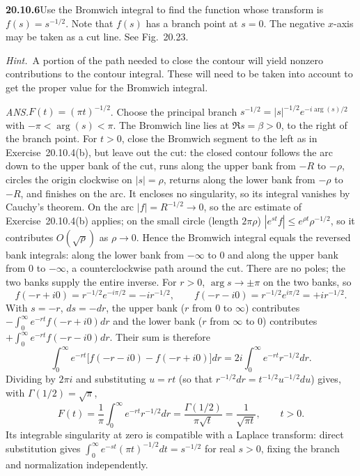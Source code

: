 \par\bigskip
\noindent\textbf{20.10.6}\quad Use the Bromwich integral to find
the function whose transform is $f(s)=s^{-1/2}$. Note that $f(s)$
has a branch point at $s=0$. The negative $x$-axis may be taken
as a cut line. See Fig.~20.23.
\par\emph{Hint.}~A portion of the path needed to close the
contour will yield nonzero contributions to the contour integral.
These will need to be taken into account to get the proper value
for the Bromwich integral.
\par\nobreak\hfill\emph{ANS.}\enspace$F(t)=(\pi t)^{-1/2}$.
\solution
Choose the principal branch
$s^{-1/2}=|s|^{-1/2}e^{-i\arg(s)/2}$ with
$-\pi<\arg(s)<\pi$. The Bromwich line lies at
$\Re s=\beta>0$, to the right of the branch point. For $t>0$,
close the Bromwich segment
to the left as in Exercise~20.10.4(b), but leave out the cut:
the closed contour follows the arc down to the upper bank of
the cut, runs along the upper bank from $-R$ to $-\rho$,
circles the origin clockwise on $|s|=\rho$, returns along the
lower bank from $-\rho$ to $-R$, and finishes on the arc. It
encloses no singularity, so its integral vanishes by Cauchy's
theorem. On the arc $|f|=R^{-1/2}\to0$, so the arc estimate of
Exercise~20.10.4(b) applies; on the small circle (length
$2\pi\rho$) $|e^{st}f|\le e^{\rho t}\rho^{-1/2}$, so it
contributes $O(\sqrt\rho)$ as $\rho\to0$. Hence the Bromwich
integral equals the reversed bank integrals: along the lower
bank from $-\infty$ to $0$ and along the upper bank from $0$
to $-\infty$, a counterclockwise path around the cut.
There are no poles; the two banks supply the entire inverse.
For $r>0$, $\arg s\to\pm\pi$ on the two banks, so
\[
f(-r+i0)=r^{-1/2}e^{-i\pi/2}=-i r^{-1/2},\qquad
f(-r-i0)=r^{-1/2}e^{i\pi/2}=+i r^{-1/2}.
\]
With $s=-r$, $ds=-dr$, the upper bank ($r$ from $0$ to
$\infty$) contributes $-\int_0^\infty e^{-rt}f(-r+i0)dr$ and
the lower bank ($r$ from $\infty$ to $0$) contributes
$+\int_0^\infty e^{-rt}f(-r-i0)dr$. Their sum is therefore
\[
\int_0^\infty e^{-rt}
\big[f(-r-i0)-f(-r+i0)\big]dr
=2i\int_0^\infty e^{-rt}r^{-1/2}dr.
\]
Dividing by $2\pi i$ and substituting $u=rt$ (so that
$r^{-1/2}dr=t^{-1/2}u^{-1/2}du$) gives, with
$\Gamma(1/2)=\sqrt\pi$,
\[
F(t)=\frac1\pi\int_0^\infty e^{-rt}r^{-1/2}dr
=\frac{\Gamma(1/2)}{\pi\sqrt t}
=\boxed{\frac1{\sqrt{\pi t}}},\qquad t>0.
\]
Its integrable singularity at zero is compatible with a
Laplace transform: direct substitution gives
$\int_0^\infty e^{-st}(\pi t)^{-1/2}dt=s^{-1/2}$ for
real $s>0$, fixing the branch and normalization independently.

